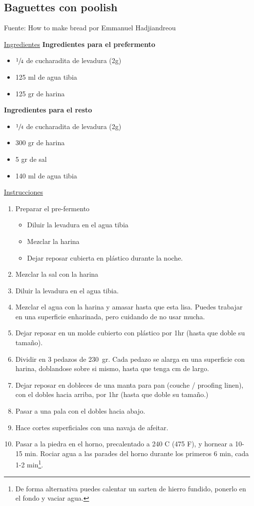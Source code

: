 \subsection{Baguettes con poolish}

Fuente: How to make bread por Emmanuel Hadjiandreou

\underline{Ingredientes}
\textbf{Ingredientes para el prefermento}
\begin{itemize}
\item $\sfrac{1}{4}$ de cucharadita de levadura (2g)
\item 125 ml de agua tibia
\item 125 gr de harina
\end{itemize}

\textbf{Ingredientes para el resto}
\begin{itemize}
\item $\sfrac{1}{4}$ de cucharadita de levadura (2g)
\item 300 gr de harina
\item 5 gr de sal
\item 140 ml de agua tibia
\end{itemize}

\underline{Instrucciones}
\begin{enumerate}
\item Preparar el pre-fermento
\begin{itemize}
\item Diluir la levadura en el agua tibia
\item Mezclar la harina
\item Dejar reposar cubierta en plástico durante la noche.
\end{itemize} 
\item Mezclar la sal con la harina
\item Diluir la levadura en el agua tibia.
\item Mezclar el agua con la harina y amasar hasta que esta lisa. Puedes trabajar en una superficie enharinada, pero cuidando de no usar mucha.
\item Dejar reposar en un molde cubierto con plástico por \Sim 1hr (hasta que doble su tamaño).
\item Dividir en 3 pedazos de \SI{230}{gr}. Cada pedazo se alarga en una superficie con harina, doblandose sobre si mismo, hasta que tenga  cm de largo.
\item Dejar reposar en dobleces de una manta para pan (couche / proofing linen), con el dobles hacia arriba, por \Sim 1hr (hasta que doble su tamaño.)
\item Pasar a una pala con el dobles hacia abajo.
\item Hace cortes superficiales con una navaja de afeitar.
\item Pasar a la piedra en el horno, precalentado a 240 C (475 F), y hornear a 10-15 min. Rociar agua a las parades del horno durante los primeros 6 min, cada 1-2 min\footnote{De forma alternativa puedes calentar un sarten de hierro fundido, ponerlo en el fondo y vaciar agua.}.
\end{enumerate}
